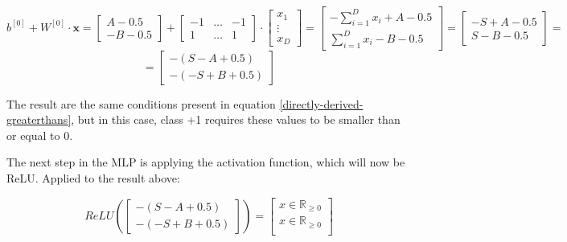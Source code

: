 \documentclass[12pt]{article}
\begin{document}
\begin{itemize}
        \[
            b^{[0]} + W^{[0]} \cdot \textbf{x} =
            \begin{bmatrix}
                A-0.5 \\
                -B-0.5
            \end{bmatrix}
            +
            \begin{bmatrix}
                -1 & \hdots & -1 \\
                1 & \hdots & 1
            \end{bmatrix}
            \cdot
            \begin{bmatrix}
                x_1 \\
                \vdots \\
                x_D
            \end{bmatrix}
            =
            \begin{bmatrix}
                -\sum_{i=1}^{D} x_i  + A - 0.5 \\
                \sum_{i=1}^{D} x_i - B - 0.5
            \end{bmatrix}
            =
            \begin{bmatrix}
                - S + A - 0.5\\
                S -B - 0.5
            \end{bmatrix}
            =
        \]
        \begin{equation}
        =
            \begin{bmatrix}
                - (S - A + 0.5)\\
                - (-S + B + 0.5)
                \end{bmatrix}
                \label{z1-relu}
        \end{equation}

        The result are the same conditions present in equation \ref{directly-derived-greaterthans}, but in this case, class +1 requires these values to be smaller than or equal to 0.

        The next step in the MLP is applying the activation function, which will now be ReLU. Applied to the result above:

        \[
            ReLU(
            \begin{bmatrix}
                - (S - A + 0.5)\\
                - (-S + B + 0.5)
            \end{bmatrix}
            ) =
            \begin{bmatrix}
                x \in \mathbb{R}_{\geq 0} \\
                x \in \mathbb{R}_{\geq 0} \\
            \end{bmatrix}
        \]


\end{itemize}
\end{document}
